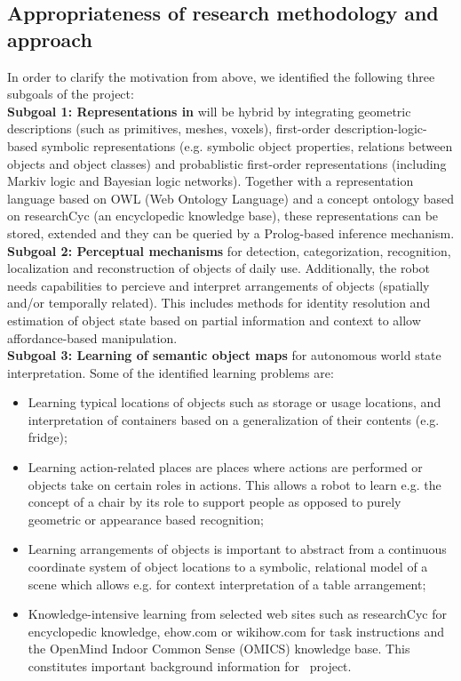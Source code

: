 \subsection{Appropriateness of research methodology and approach}
\label{sec:q2}
In order to clarify the motivation from above, we identified
the following three subgoals of the project: \\
\textbf{Subgoal 1: Representations in \ksem} will be hybrid by
  integrating geometric descriptions (such as primitives, meshes,
  voxels), first-order description-logic-based symbolic representations
  (e.g. symbolic object properties, relations between objects and object
  classes) and probablistic first-order representations (including
  Markiv logic and Bayesian logic networks).
  Together with a representation language based on OWL (Web Ontology
  Language) and a concept ontology based on researchCyc (an encyclopedic
  knowledge base), these representations can be stored, extended and
  they can be queried by a Prolog-based inference mechanism.\\
\textbf{Subgoal 2: Perceptual mechanisms} for detection,
  categorization, recognition, localization and reconstruction of
  objects of daily use. Additionally, the robot needs capabilities to
  percieve and interpret arrangements of objects (spatially and/or
  temporally related). This includes methods for identity resolution and
  estimation of object state based on partial information and context to
  allow affordance-based manipulation. \\
\textbf{Subgoal 3: Learning of semantic object maps} for autonomous world state
  interpretation. Some of the identified learning problems are:
  \begin{itemize}
    \item Learning typical locations of objects such as storage or
      usage locations, and interpretation of containers based on a
      generalization of their contents (e.g. fridge);
    \item Learning action-related places are places where actions are
      performed or objects take on certain roles in actions. This allows
      a robot to learn e.g. the concept of a chair by its role to
      support people as opposed to purely geometric or appearance
      based recognition;
    \item Learning arrangements of objects is important to abstract from
      a continuous coordinate system of object locations to a symbolic,
      relational model of a scene which allows e.g. for context
      interpretation of a table arrangement;
    \item Knowledge-intensive learning from selected web sites such as
      researchCyc for encyclopedic knowledge, ehow.com or wikihow.com
      for task instructions and the OpenMind Indoor Common Sense (OMICS)
      knowledge base. This constitutes important background information
      for \ksem\ project.
  \end{itemize}

